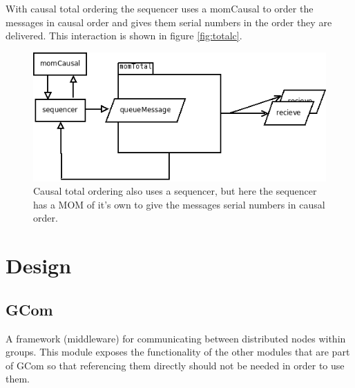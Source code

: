 \documentclass[english]{article}
\begin{document}
With causal total ordering the sequencer uses a momCausal to order the messages in causal order and gives them serial numbers in the order they are delivered. This interaction is shown in figure \vref{fig:totalc}.

\begin{figure}
\includegraphics[width=\textwidth]{momTotalC.png}
\caption{Causal total ordering also uses a sequencer, but here the sequencer has a MOM of it's own to give the messages serial numbers in causal order.}
\label{fig:totalc}
\end{figure}
\section{Design}
\subsection{GCom}
A framework (middleware) for communicating between distributed nodes within groups.
This module exposes the functionality of the other modules that are part of GCom so that referencing them directly should not be needed in order to use them.
\end{document}
